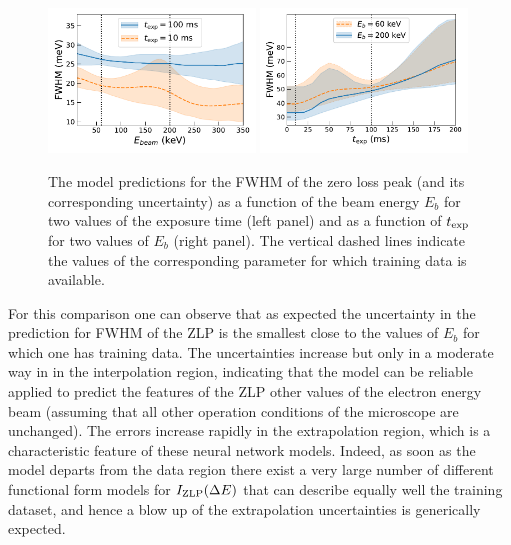 \begin{figure}[t]
    \centering
    \includegraphics[width=0.49\textwidth]{plots/Ebeam_extrapolation.pdf}
    \includegraphics[width=0.49\textwidth]{plots/time_extrapolation.pdf}
    \caption{The model predictions for the FWHM of the zero loss peak
      (and its corresponding uncertainty) as a function of the beam energy $E_b$
      for two values of the exposure time (left panel)
      and as a function of $t_{\rm exp}$ for two values of $E_b$ (right panel).
      The vertical dashed lines indicate the values of the
      corresponding parameter for which training data is available.
    }
    \label{fig:extrapolbeam}
\end{figure}

For this comparison one can observe that as expected the uncertainty in the  prediction for FWHM
of the ZLP is the smallest close to the values of $E_b$ for which one has training data.
%
The uncertainties increase but only in a moderate way in in the interpolation region, indicating that
the model can be reliable applied to predict the features of the ZLP other values of the electron
energy beam (assuming that all other operation conditions of the microscope are unchanged).
%
The errors increase rapidly in the extrapolation region, which is a characteristic feature of
these neural network models.
%
Indeed, as soon as the model departs from the data region there exist a very large
number of different functional form models for $I_{\rm ZLP}(\Delta E)$ that can describe equally well
the training dataset, and hence a blow up of the extrapolation uncertainties is generically expected.

